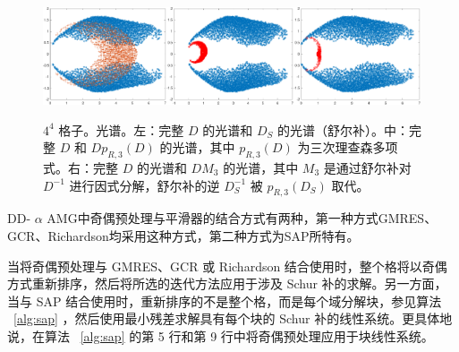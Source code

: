 \documentclass[5p,times,a4paper,fleqn]{cas-dc}
\begin{document}
   \begin{figure}
\includegraphics[width=0.325\textwidth]{oddeven_spectrum.pdf}\includegraphics[width=0.335\textwidth]{odd_even_with_Richardson.pdf}\includegraphics[width=0.335\textwidth]{non_odd_even_with_Richardson.pdf}
\caption{   $4^4$    格子。光谱。左：完整    $D$    的光谱和    $D_{S}$    的光谱（舒尔补）。中：完整    $D$    和    $D p_{R,3}(D)$    的光谱，其中    $p_{R,3}(D)$    为三次理查森多项式。右：完整    $D$    的光谱和    $D M_{3}$    的光谱，其中    $M_{3}$    是通过舒尔补对    $D^{-1}$    进行因式分解，舒尔补的逆    $D_{S}^{-1}$    被    $p_{R,3}(D_{S})$    取代。  } \label{fig:oddeven_spectra_with_Richardson}
\end{figure}     

DD-   $\alpha$    AMG中奇偶预处理与平滑器的结合方式有两种，第一种方式GMRES、GCR、Richardson均采用这种方式，第二种方式为SAP所特有。  

当将奇偶预处理与 GMRES、GCR 或 Richardson 结合使用时，整个格将以奇偶方式重新排序，然后将所选的迭代方法应用于涉及 Schur 补的求解。另一方面，当与 SAP 结合使用时，重新排序的不是整个格，而是每个域分解块，参见算法 \     \ref{alg:sap}    ，然后使用最小残差求解具有每个块的 Schur 补的线性系统。更具体地说，在算法 \     \ref{alg:sap}    的第 5 行和第 9 行中将奇偶预处理应用于块线性系统。  
\end{document}
